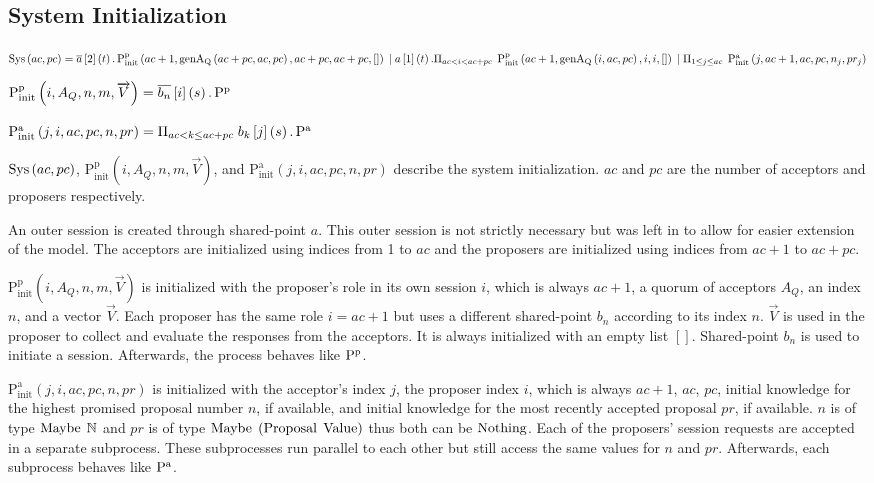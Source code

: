 \newcommand{\PpInit}[5]{\operatorname{P^p_{init}}\left(#1, #2, #3, #4, #5\right)}
\newcommand{\PaInit}[6]{\operatorname{P^a_{init}}\left(#1, #2, #3, #4, #5, #6\right)}

\subsection{System Initialization}
\newcommand{\SessionRequest}[3]{\overline{#1}\left[#2\right]\left(#3\right)}
\newcommand{\SessionAccept}[3]{#1\left[#2\right]\left(#3\right)}
\newcommand{\ParallelFor}[1]{\Pi_{#1}\;}
\newcommand{\VectorV}[0]{\overrightarrow{V}}

$\Sys{ac}{pc} = \SessionRequest{a}{2}{t} . \PpInit{ac + 1}{\genAq{ac + pc}{ac}{pc}}{ac + pc}{ac + pc}{[]}\\
\Or \SessionAccept{a}{1}{t} . \ParallelFor{ac < i < ac + pc} \PpInit{ac + 1}{\genAq{i}{ac}{pc}}{i}{i}{[]} \\
\Or \ParallelFor{1 \le j \le ac} \PaInit{j}{ac + 1}{ac}{pc}{n_j}{pr_j}$

$\PpInit{i}{A_Q}{n}{m}{\VectorV} = \SessionRequest{b_n}{i}{s} . \Pp$

$\PaInit{j}{i}{ac}{pc}{n}{pr} = \ParallelFor{ac < k \le ac + pc} \SessionAccept{b_k}{j}{s} . \Pa$

$\operatorname{Sys}\left(ac, pc\right)$, $\PpInit{i}{A_Q}{n}{m}{\VectorV}$, and $\PaInit{j}{i}{ac}{pc}{n}{pr}$ describe the system initialization.
$ac$ and $pc$ are the number of acceptors and proposers respectively.

An outer session is created through shared-point $a$.
This outer session is not strictly necessary but was left in to allow for easier extension of the model.
The acceptors are initialized using indices from 1 to $ac$ and the proposers are initialized using indices from $ac + 1$ to $ac + pc$.

$\PpInit{i}{A_Q}{n}{m}{\VectorV}$ is initialized with the proposer's role in its own session $i$, which is always $ac + 1$, a quorum of acceptors $A_Q$, an index $n$, and a vector $\VectorV$.
Each proposer has the same role $i = ac + 1$ but uses a different shared-point $b_n$ according to its index $n$.
$\VectorV$ is used in the proposer to collect and evaluate the responses from the acceptors.
It is always initialized with an empty list $[]$.
Shared-point $b_n$ is used to initiate a session.
Afterwards, the process behaves like $\operatorname{P^p}$.

$\PaInit{j}{i}{ac}{pc}{n}{pr}$ is initialized with the acceptor's index $j$, the proposer index $i$, which is always $ac + 1$, $ac$, $pc$, initial knowledge for the highest promised proposal number $n$, if available, and initial knowledge for the most recently accepted proposal $pr$, if available.
$n$ is of type $\operatorname{Maybe}\; \mathbb{N}$ and $pr$ is of type $\operatorname{Maybe}\; \left(\operatorname{Proposal}\; \operatorname{Value}\right)$ thus both can be $\operatorname{Nothing}$.
Each of the proposers' session requests are accepted in a separate subprocess.
These subprocesses run parallel to each other but still access the same values for $n$ and $pr$.
Afterwards, each subprocess behaves like $\operatorname{P^a}$.

